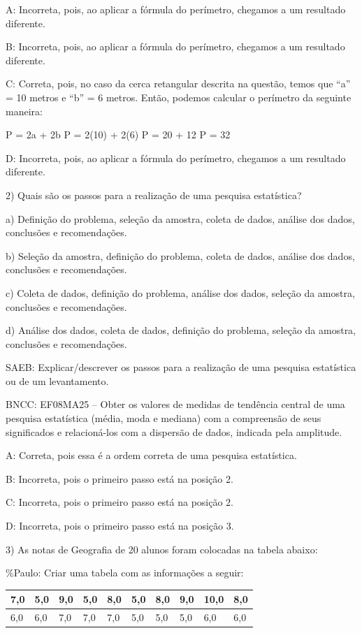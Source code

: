 A: Incorreta, pois, ao aplicar a fórmula do perímetro, chegamos a um
resultado diferente.

B: Incorreta, pois, ao aplicar a fórmula do perímetro, chegamos a um
resultado diferente.

C: Correta, pois, no caso da cerca retangular descrita na questão, temos
que ``a'' = 10 metros e ``b'' = 6 metros. Então, podemos calcular o
perímetro da seguinte maneira:

P = 2a + 2b P = 2(10) + 2(6) P = 20 + 12 P = 32

D: Incorreta, pois, ao aplicar a fórmula do perímetro, chegamos a um
resultado diferente.

2) Quais são os passos para a realização de uma pesquisa estatística?

a) Definição do problema, seleção da amostra, coleta de dados, análise
dos dados, conclusões e recomendações.

b) Seleção da amostra, definição do problema, coleta de dados, análise
dos dados, conclusões e recomendações.

c) Coleta de dados, definição do problema, análise dos dados, seleção da
amostra, conclusões e recomendações.

d) Análise dos dados, coleta de dados, definição do problema, seleção da
amostra, conclusões e recomendações.

SAEB: Explicar/descrever os passos para a realização de uma pesquisa
estatística ou de um levantamento.

BNCC: EF08MA25 -- Obter os valores de medidas de tendência central de
uma pesquisa estatística (média, moda e mediana) com a compreensão de
seus significados e relacioná-los com a dispersão de dados, indicada
pela amplitude.

A: Correta, pois essa é a ordem correta de uma pesquisa estatística.

B: Incorreta, pois o primeiro passo está na posição 2.

C: Incorreta, pois o primeiro passo está na posição 2.

D: Incorreta, pois o primeiro passo está na posição 3.

3) As notas de Geografia de 20 alunos foram colocadas na tabela abaixo:

\%Paulo: Criar uma tabela com as informações a seguir:

\begin{longtable}[]{@{}llllllllll@{}}
\toprule
7,0 & 5,0 & 9,0 & 5,0 & 8,0 & 5,0 & 8,0 & 9,0 & 10,0 &
8,0\tabularnewline
\midrule
\endhead
6,0 & 6,0 & 7,0 & 7,0 & 7,0 & 5,0 & 5,0 & 5,0 & 6,0 & 6,0\tabularnewline
\bottomrule
\end{longtable}

